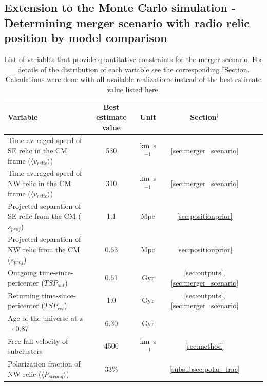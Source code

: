 \documentclass[letterpaper,useAMS,usenatbib]{mn2e}
\begin{document}

\subsection{Extension to the Monte Carlo simulation - Determining merger
scenario with radio relic position by model comparison}
\begin{table}
	\begin{minipage}{170mm} 
	\caption{List of variables that provide quantitative constraints for the merger
		scenario. For details of the distribution of each variable see the corresponding
	$^\dagger$Section. Calculations were done with all available realizations
instead of the best estimate value listed here.}
\begin{center} 
\begin{tabular}{@{}lccccc}
	\hline \hline Variable & Best estimate value & Unit & Section$^{\dagger}$ \\ 
	\hline
Time averaged speed of SE relic in the CM frame ($\langle v_{relic} \rangle$) 
& 530 &  km~s$^{-1}$  & \ref{sec:merger_scenario}\\
Time averaged speed of NW relic in the CM frame ($\langle v_{relic} \rangle$) &
  310 &  km~s$^{-1} $ & \ref{sec:merger_scenario}\\
Projected separation of SE relic from the CM ($s_{proj}$)  & 1.1  & Mpc & \ref{sec:positionprior} \\ 
Projected separation of NW relic from the CM ($s_{proj}$)  & 0.63 & Mpc & \ref{sec:positionprior} \\ 
Outgoing time-since-pericenter ($TSP_{out}$)  &  0.61 & Gyr &
\ref{sec:outputs}, 
\ref{sec:merger_scenario}
\\ 
Returning time-since-pericenter ($TSP_{ret}$)  & 1.0 & Gyr & \ref{sec:outputs}, 
\ref{sec:merger_scenario}
\\ 
Age of the universe at z = 0.87 & 6.30 & Gyr&  \\ 
Free fall velocity of subclusters & 4500 & km~s$^{-1}$ & \ref{sec:method}\\  
Polarization fraction of NW relic ($\langle P_{strong} \rangle$) & 33\% &  &
\ref{subsubsec:polar_frac}\\ 
\hline 
\end{tabular} 
\end{center} 
\label{tab:input_contraints} 
\end{minipage}
\end{table} 
\end{document}
